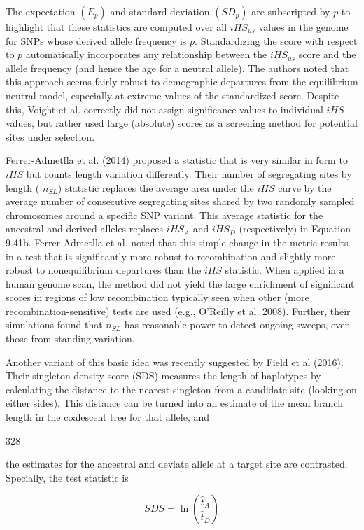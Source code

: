 \documentclass{article}
\begin{document}
The expectation  $ (E_p) $ and standard deviation  $ (SD_p) $ are subscripted by  $ p $ to highlight that these statistics are computed over all  $ iHS_{us} $ values in the genome for SNPs whose derived allele frequency is  $ p $. Standardizing the score with respect to  $ p $ automatically incorporates any relationship between the  $ iHS_{us} $ score and the allele frequency (and hence the age for a neutral allele). The authors noted that this approach seems fairly robust to demographic departures from the equilibrium neutral model, especially at extreme values of the standardized score. Despite this, Voight et al. correctly did not assign significance values to individual  $ iHS $ values, but rather used large (absolute) scores as a screening method for potential sites under selection.

Ferrer-Admetlla et al. (2014) proposed a statistic that is very similar in form to  $ iHS $ but counts length variation differently. Their number of segregating sites by length ( $ n_{SL} $) statistic replaces the average area under the  $ iHS $ curve by the average number of consecutive segregating sites shared by two randomly sampled chromosomes around a specific SNP variant. This average statistic for the ancestral and derived alleles replaces  $ iHS_{A} $ and  $ iHS_{D} $ (respectively) in Equation 9.41b. Ferrer-Admetlla et al. noted that this simple change in the metric results in a test that is significantly more robust to recombination and slightly more robust to nonequilibrium departures than the  $ iHS $ statistic. When applied in a human genome scan, the method did not yield the large enrichment of significant scores in regions of low recombination typically seen when other (more recombination-sensitive) tests are used (e.g., O'Reilly et al. 2008). Further, their simulations found that  $ n_{SL} $ has reasonable power to detect ongoing sweeps, even those from standing variation.

Another variant of this basic idea was recently suggested by Field et al (2016). Their singleton density score (SDS) measures the length of haplotypes by calculating the distance to the nearest singleton from a candidate site (looking on either sides). This distance can be turned into an estimate of the mean branch length in the coalescent tree for that allele, and

328

the estimates for the ancestral and deviate allele at a target site are contrasted. Specially, the test statistic is

\begin{equation}
SDS=\ln\left(\frac{\widehat{t}_{A}}{\widehat{t}_{D}}\right)
\tag{9.42}
\label{eq:9_42}
\end{equation}
\end{document}
